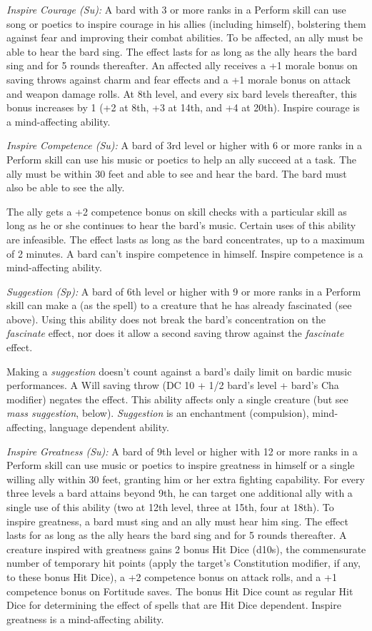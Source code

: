 \textit{Inspire Courage (Su):} A bard with 3 or more ranks in a Perform skill can use song or poetics to inspire courage in his allies (including himself), bolstering them against fear and improving their combat abilities. To be affected, an ally must be able to hear the bard sing. The effect lasts for as long as the ally hears the bard sing and for 5 rounds thereafter. An affected ally receives a +1 morale bonus on saving throws against charm and fear effects and a +1 morale bonus on attack and weapon damage rolls. At 8th level, and every six bard levels thereafter, this bonus increases by 1 (+2 at 8th, +3 at 14th, and +4 at 20th). Inspire courage is a mind-affecting ability.

\textit{Inspire Competence (Su):} A bard of 3rd level or higher with 6 or more ranks in a Perform skill can use his music or poetics to help an ally succeed at a task. The ally must be within 30 feet and able to see and hear the bard. The bard must also be able to see the ally.

The ally gets a +2 competence bonus on skill checks with a particular skill as long as he or she continues to hear the bard's music. Certain uses of this ability are infeasible. The effect lasts as long as the bard concentrates, up to a maximum of 2 minutes. A bard can't inspire competence in himself. Inspire competence is a mind-affecting ability.

\textit{Suggestion (Sp):} A bard of 6th level or higher with 9 or more ranks in a Perform skill can make a  (as the spell) to a creature that he has already fascinated (see above). Using this ability does not break the bard's concentration on the \textit{fascinate} effect, nor does it allow a second saving throw against the \textit{fascinate} effect.

Making a \textit{suggestion} doesn't count against a bard's daily limit on bardic music performances. A Will saving throw (DC 10 + 1/2 bard's level + bard's Cha modifier) negates the effect. This ability affects only a single creature (but see \textit{mass suggestion}, below). \textit{Suggestion} is an enchantment (compulsion), mind-affecting, language dependent ability.

\textit{Inspire Greatness (Su):} A bard of 9th level or higher with 12 or more ranks in a Perform skill can use music or poetics to inspire greatness in himself or a single willing ally within 30 feet, granting him or her extra fighting capability. For every three levels a bard attains beyond 9th, he can target one additional ally with a single use of this ability (two at 12th level, three at 15th, four at 18th). To inspire greatness, a bard must sing and an ally must hear him sing. The effect lasts for as long as the ally hears the bard sing and for 5 rounds thereafter. A creature inspired with greatness gains 2 bonus Hit Dice (d10s), the commensurate number of temporary hit points (apply the target's Constitution modifier, if any, to these bonus Hit Dice), a +2 competence bonus on attack rolls, and a +1 competence bonus on Fortitude saves. The bonus Hit Dice count as regular Hit Dice for determining the effect of spells that are Hit Dice dependent. Inspire greatness is a mind-affecting ability.

